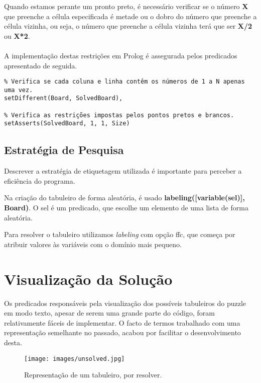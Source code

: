 \documentclass[runningheads,a4paper]{llncs}
\begin{document}
Quando estamos perante um pronto preto, é necessário verificar se o número \textbf{X} que preenche a célula especificada é metade ou o dobro do número que preenche a célula vizinha, ou seja, o número que preenche a célula vizinha terá que ser \textbf{X/2} ou \textbf{X*2}.  

\paragraph{}
A implementação destas restrições em Prolog é assegurada pelos predicados apresentado de seguida. 

\begin{verbatim}
% Verifica se cada coluna e linha contêm os números de 1 a N apenas uma vez.
setDifferent(Board, SolvedBoard),

% Verifica as restrições impostas pelos pontos pretos e brancos.
setAsserts(SolvedBoard, 1, 1, Size)
\end{verbatim}

\subsection{Estratégia de Pesquisa}

Descrever a estratégia de etiquetagem utilizada é importante para perceber a eficiência do programa.

Na criação do tabuleiro de forma aleatória, é usado \textbf{labeling([variable(sel)], Board)}. O sel é um predicado, que escolhe um elemento de uma lista de forma aleatória.

Para resolver o tabuleiro utilizamos \textit{labeling} com opção ffc, que começa por atribuir valores às variáveis com o domínio mais pequeno.

\section{Visualização da Solução}

Os predicados responsáveis pela visualização dos possíveis tabuleiros do puzzle em modo texto, apesar de serem uma grande parte do código, foram relativamente fáceis de implementar. O facto de termos trabalhado com uma representação semelhante no passado, acabou por facilitar o desenvolvimento desta.

\begin{figure}[H]
	\centering
	\texttt{[image: images/unsolved.jpg]}
	\caption{Representação de um tabuleiro, por resolver.}
	\label{fig:unsolved}
\end{figure}
\end{document}
